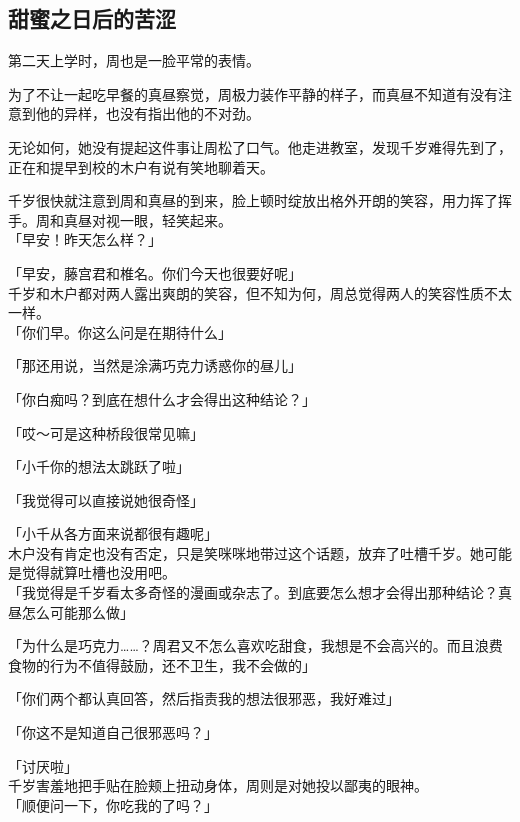 \subsection{甜蜜之日后的苦涩}

第二天上学时，周也是一脸平常的表情。

为了不让一起吃早餐的真昼察觉，周极力装作平静的样子，而真昼不知道有没有注意到他的异样，也没有指出他的不对劲。

无论如何，她没有提起这件事让周松了口气。他走进教室，发现千岁难得先到了，正在和提早到校的木户有说有笑地聊着天。

千岁很快就注意到周和真昼的到来，脸上顿时绽放出格外开朗的笑容，用力挥了挥手。周和真昼对视一眼，轻笑起来。\\

「早安！昨天怎么样？」

「早安，藤宫君和椎名。你们今天也很要好呢」\\

千岁和木户都对两人露出爽朗的笑容，但不知为何，周总觉得两人的笑容性质不太一样。\\

「你们早。你这么问是在期待什么」

「那还用说，当然是涂满巧克力诱惑你的昼儿」

「你白痴吗？到底在想什么才会得出这种结论？」

「哎～可是这种桥段很常见嘛」

「小千你的想法太跳跃了啦」

「我觉得可以直接说她很奇怪」

「小千从各方面来说都很有趣呢」\\

木户没有肯定也没有否定，只是笑咪咪地带过这个话题，放弃了吐槽千岁。她可能是觉得就算吐槽也没用吧。\\

「我觉得是千岁看太多奇怪的漫画或杂志了。到底要怎么想才会得出那种结论？真昼怎么可能那么做」

「为什么是巧克力……？周君又不怎么喜欢吃甜食，我想是不会高兴的。而且浪费食物的行为不值得鼓励，还不卫生，我不会做的」

「你们两个都认真回答，然后指责我的想法很邪恶，我好难过」

「你这不是知道自己很邪恶吗？」

「讨厌啦」\\

千岁害羞地把手贴在脸颊上扭动身体，周则是对她投以鄙夷的眼神。\\

「顺便问一下，你吃我的了吗？」

